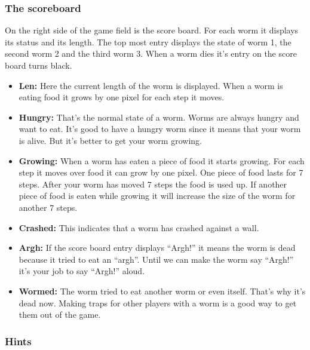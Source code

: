 \subsubsection{The scoreboard}
On the right side of the game field is the score board. For each worm it
displays its status and its length. The top most entry displays the
state of worm 1, the second worm 2 and the third worm 3. When a worm
dies it's entry on the score board turns black.

\begin{itemize}
\item \textbf{Len:}
Here the current length of the worm is displayed. When a worm is eating
food it grows by one pixel for each step it moves. 

\item \textbf{Hungry:}
That's the normal state of a worm. Worms are always
hungry and want to eat. It's good to have a hungry
worm since it means that your worm is alive. But it's
better to get your worm growing. 

\item \textbf{Growing:}
When a worm has eaten a piece of food it starts growing. For each step
it moves over food it can grow by one pixel. One piece of food lasts
for 7 steps. After your worm has moved 7 steps the food is used up. If
another piece of food is eaten while growing it will increase the size
of the worm for another 7 steps. 

\item \textbf{Crashed:}
This indicates that a worm has crashed against a wall.

\item \textbf{Argh:}
If the score board entry displays ``Argh!'' it
means the worm is dead because it tried to eat an ``argh''. Until we
can make the worm say ``Argh!'' it's your job to say ``Argh!'' aloud.

\item \textbf{Wormed:}
The worm tried to eat another worm or even itself.
That's why it's dead now.  Making traps for other players with a worm
is a good way to get them out of the game.
\end{itemize}

\subsubsection{Hints}

